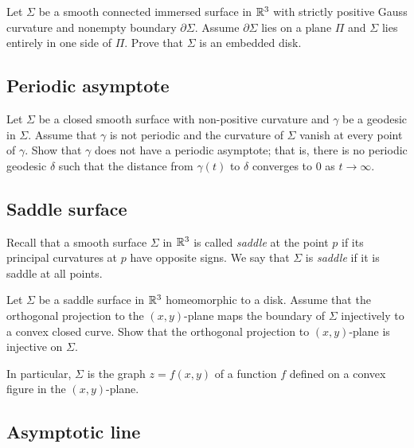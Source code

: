 \begin{pr}
Let $\Sigma$ be a smooth connected immersed surface in $\mathbb{R}^3$ with strictly positive Gauss curvature and nonempty boundary $\partial\Sigma$.
Assume $\partial\Sigma$ lies on a plane $\Pi$
and $\Sigma$ lies entirely in one side of $\Pi$.
Prove that $\Sigma$ is an embedded disk.
\end{pr}

\subsection*{Periodic asymptote}
\label{Asymptotic geodesic}

\begin{pr}
Let $\Sigma$ be a closed smooth surface with non-positive curvature
and $\gamma$ be a geodesic in $\Sigma$.
Assume that $\gamma$ is not periodic
and the curvature of $\Sigma$ vanish at every point of $\gamma$.
Show that $\gamma$ does not have a periodic asymptote;
that is, there is no periodic geodesic $\delta$ such that the distance from $\gamma(t)$ to $\delta$  converges to $0$ as $t\to\infty$. 
\end{pr}

\subsection*{Saddle surface}
\label{Saddle surface}

Recall that a smooth surface $\Sigma$ in $\mathbb{R}^3$
is called \emph{saddle} at the point $p$ if its principal curvatures at $p$ have opposite signs. 
We say that $\Sigma$ is {}\emph{saddle} if it is saddle at all points.

\begin{pr}
Let $\Sigma$ be a saddle surface in $\mathbb{R}^3$
homeomorphic to a disk.
Assume that the orthogonal projection to the $(x,y)$-plane
maps the boundary of $\Sigma$
injectively to a convex closed curve.
Show that the orthogonal projection to $(x,y)$-plane is injective on $\Sigma$.

In particular, $\Sigma$ is the graph $z=f(x,y)$ of a function $f$ defined on a convex figure in the $(x,y)$-plane.
\end{pr}


\subsection*{Asymptotic line}
\label{asymptotic-line}

